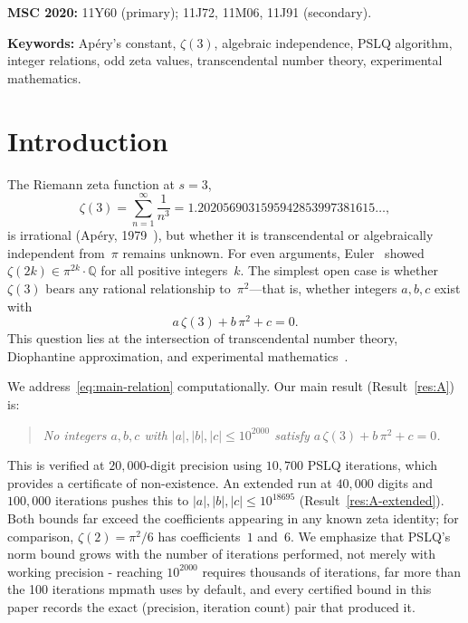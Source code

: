 \documentclass[12pt]{article}
\theoremstyle{definition}
\theoremstyle{remark}
\newcommand{\Q}{\mathbb{Q}}
\begin{document}
\noindent\textbf{MSC 2020:} 11Y60 (primary); 11J72, 11M06, 11J91 (secondary).

\medskip\noindent\textbf{Keywords:}
Ap\'ery's constant, $\zeta(3)$, algebraic independence, PSLQ algorithm,
integer relations, odd zeta values, transcendental number theory,
experimental mathematics.


\section{Introduction}\label{sec:intro}

The Riemann zeta function at $s=3$,
\[
  \zeta(3) = \sum_{n=1}^{\infty} \frac{1}{n^3}
           = 1.2020569031595942853997381615\ldots,
\]
is irrational (Ap\'ery, 1979~\cite{Apery1979}), but whether it is
transcendental or algebraically independent from~$\pi$ remains unknown.
For even arguments, Euler~\cite{Euler1734} showed
$\zeta(2k)\in\pi^{2k}\cdot\Q$ for all positive integers~$k$.  The
simplest open case is whether $\zeta(3)$ bears any rational
relationship to~$\pi^2$---that is, whether integers $a,b,c$ exist
with
\begin{equation}\label{eq:main-relation}
  a\,\zeta(3) + b\,\pi^2 + c = 0.
\end{equation}
This question lies at the intersection of transcendental number theory,
Diophantine approximation, and experimental
mathematics~\cite{BaileyBorwein2005, BorweinBailey2004}.

We address~\eqref{eq:main-relation} computationally.  Our main result
(Result~\ref{res:A}) is:
\begin{quote}
\emph{No integers $a,b,c$ with $|a|,|b|,|c|\le 10^{2000}$ satisfy
$a\,\zeta(3)+b\,\pi^2+c=0$.}
\end{quote}
\noindent This is verified at $20{,}000$-digit precision using
$10{,}700$ PSLQ iterations, which provides a certificate of
non-existence. An extended run at $40{,}000$ digits and $100{,}000$
iterations pushes this to $|a|,|b|,|c|\le 10^{18695}$
(Result~\ref{res:A-extended}). Both bounds far exceed the coefficients
appearing in any known zeta identity; for comparison,
$\zeta(2)=\pi^2/6$ has coefficients~$1$ and~$6$. We emphasize that
PSLQ's norm bound grows with the number of iterations performed, not
merely with working precision - reaching $10^{2000}$ requires
thousands of iterations, far more than the 100 iterations mpmath uses
by default, and every certified bound in this paper records the exact
(precision, iteration count) pair that produced it.
\end{document}
